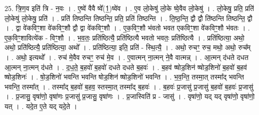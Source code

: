 \documentclass[17pt]{extarticle}
\begin{document}
25. त्रि॒ण॒व इति॑ त्रि - न॒वः । . ए॒ष्वे॑ वैवै ष्वे᳚(1॒)ष्वे॑व । . ए॒व लो॒केषु॑ लो॒के ष्वे॒वैव लो॒केषु॑ । . लो॒केषु॒ प्रति॒ प्रति॑ लो॒केषु॑ लो॒केषु॒ प्रति॑ । . प्रति॑ तिष्ठन्ति तिष्ठन्ति॒ प्रति॒ प्रति॑ तिष्ठन्ति । . ति॒ष्ठ॒न्ति॒ द्वौ द्वौ ति॑ष्ठन्ति तिष्ठन्ति॒ द्वौ । . द्वा वे॑कविꣳ॒॒शा वे॑कविꣳ॒॒शौ द्वौ द्वा वे॑कविꣳ॒॒शौ । . ए॒क॒विꣳ॒॒शौ भ॑वतो भवत एकविꣳ॒॒शा वे॑कविꣳ॒॒शौ भ॑वतः । . ए॒क॒विꣳ॒॒शावित्ये॑क - विꣳ॒॒शौ । . भ॒व॒तः॒ प्रति॑ष्ठित्यै॒ प्रति॑ष्ठित्यै भवतो भवतः॒ प्रति॑ष्ठित्यै । . प्रति॑ष्ठित्या॒ अथो॒ अथो॒ प्रति॑ष्ठित्यै॒ प्रति॑ष्ठित्या॒ अथो᳚ । . प्रति॑ष्ठित्या॒ इति॒ प्रति॑ - स्थि॒त्यै॒ । . अथो॒ रुचꣳ॒॒ रुच॒ मथो॒ अथो॒ रुच᳚म् । . अथो॒ इत्यथो᳚ । . रुच॑ मे॒वैव रुचꣳ॒॒ रुच॑ मे॒व । . ए॒वात्मन् ना॒त्मन् ने॒वै वात्मन्न् । . आ॒त्मन् द॑धते दधत आ॒त्मन् ना॒त्मन् द॑धते । . द॒ध॒ते॒ ब॒हवो॑ ब॒हवो॑ दधते दधते ब॒हवः॑ । . ब॒हव॑ ष्षोड॒शिन॑ ष्षोड॒शिनो॑ ब॒हवो॑ ब॒हव॑ ष्षोड॒शिनः॑ । . षो॒ड॒शिनो॑ भवन्ति भवन्ति षोड॒शिन॑ ष्षोड॒शिनो॑ भवन्ति । . भ॒व॒न्ति॒ तस्मा॒त् तस्मा᳚द् भवन्ति भवन्ति॒ तस्मा᳚त् । . तस्मा᳚द् ब॒हवो॑ ब॒हव॒ स्तस्मा॒त् तस्मा᳚द् ब॒हवः॑ । . ब॒हवः॑ प्र॒जासु॑ प्र॒जासु॑ ब॒हवो॑ ब॒हवः॑ प्र॒जासु॑ । . प्र॒जासु॒ वृषा॑णो॒ वृषा॑णः प्र॒जासु॑ प्र॒जासु॒ वृषा॑णः । . प्र॒जास्विति॑ प्र - जासु॑ । . वृषा॑णो॒ यद् यद् वृषा॑णो॒ वृषा॑णो॒ यत् । . यदे॒त ए॒ते यद् यदे॒ते । \newline
\end{document}
